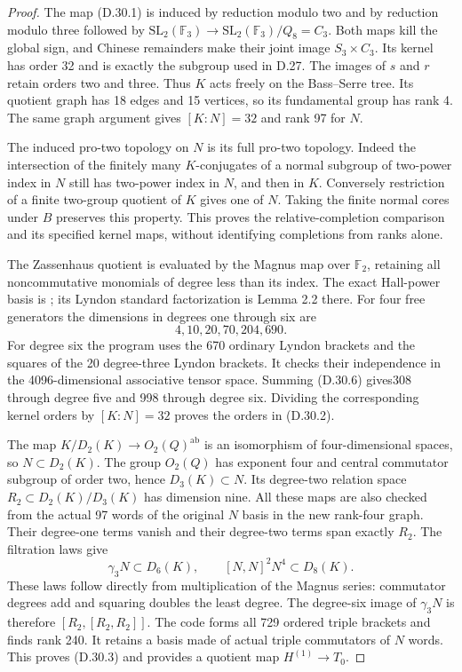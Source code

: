 \begin{proof}
The map (D.30.1) is induced by reduction modulo two and
by reduction modulo three followed by
$\mathrm{SL}_2(\mathbb F_3)\to
\mathrm{SL}_2(\mathbb F_3)/Q_8=C_3$.
Both maps kill the global sign, and Chinese remainders
make their joint image $S_3\times C_3$. Its kernel has
order 32 and is exactly the subgroup used in D.27.
The images of $s$ and $r$ retain orders two and three.
Thus $K$ acts freely on the Bass--Serre tree. Its
quotient graph has 18 edges and 15 vertices, so its
fundamental group has rank 4. The same graph argument
gives $[K:N]=32$ and rank 97 for $N$.

The induced pro-two topology on $N$ is its full pro-two
topology. Indeed the intersection of the finitely many
$K$-conjugates of a normal subgroup of two-power index
in $N$ still has two-power index in $N$, and then in $K$.
Conversely restriction of a finite two-group quotient
of $K$ gives one of $N$. Taking the finite normal cores
under $B$ preserves this property. This proves the
relative-completion comparison and its specified kernel
maps, without identifying completions from ranks alone.

The Zassenhaus quotient is evaluated by the Magnus map
over $\mathbb F_2$, retaining all noncommutative monomials
of degree less than its index. The exact Hall-power
basis is \cite[Proposition 4.4 and its proof]{dEfrat2023};
its Lyndon standard factorization is Lemma 2.2 there.
For four free generators the dimensions in degrees
one through six are
\[
                    4,10,20,70,204,690.                \tag{D.30.6}
\]
For degree six the program uses the 670 ordinary
Lyndon brackets and the squares of the 20 degree-three
Lyndon brackets. It checks their independence in the
4096-dimensional associative tensor space. Summing
(D.30.6) gives308 through degree five and 998 through
degree six. Dividing the corresponding kernel orders
by $[K:N]=32$ proves the orders in (D.30.2).

The map $K/D_2(K)\to O_2(Q)^{\mathrm{ab}}$ is an
isomorphism of four-dimensional spaces, so
$N\subset D_2(K)$. The group $O_2(Q)$ has exponent four
and central commutator subgroup of order two, hence
$D_3(K)\subset N$. Its degree-two relation space
$R_2\subset D_2(K)/D_3(K)$ has dimension nine.
All these maps are also checked from the actual 97
words of the original $N$ basis in the new rank-four
graph. Their degree-one terms vanish and their
degree-two terms span exactly $R_2$.
The filtration laws give
\[
 \gamma_3N\subset D_6(K),\qquad
 [N,N]^2N^4\subset D_8(K).                            \tag{D.30.7}
\]
These laws follow directly from multiplication of
the Magnus series: commutator degrees add and
squaring doubles the least degree. The degree-six
image of $\gamma_3N$ is therefore
$[R_2,[R_2,R_2]]$. The code forms all 729 ordered triple
brackets and finds rank 240. It retains a basis made
of actual triple commutators of $N$ words. This proves
(D.30.3) and provides a quotient map $H^{(1)}\to T_0$.


\end{proof}
